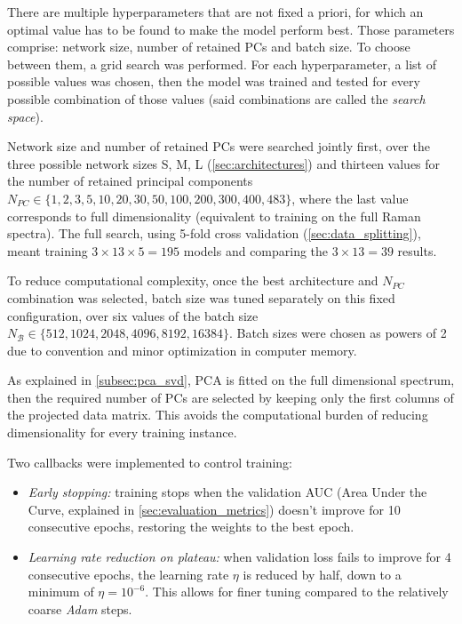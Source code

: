 There are multiple hyperparameters that are not fixed a priori, for which an optimal value has to be found to make the model perform best. Those parameters comprise: network size, number of retained PCs and batch size.
To choose between them, a grid search was performed. For each hyperparameter, a list of possible values was chosen, then the model was trained and tested for every possible combination of those values (said combinations are called the \textit{search space}).

Network size and number of retained PCs were searched jointly first, over the three possible network sizes S, M, L (\cref{sec:architectures}) and thirteen values for the number of retained principal components $N_{PC} \in \{1, 2, 3, 5, 10, 20, 30, 50, 100, 200, 300, 400, 483\}$, where the last value corresponds to full dimensionality (equivalent to training on the full Raman spectra).
The full search, using 5-fold cross validation (\cref{sec:data_splitting}), meant training $3\times 13\times 5 = 195$ models and comparing the $3\times 13 = 39$ results.

To reduce computational complexity, once the best architecture and $N_{PC}$ combination was selected, batch size was tuned separately on this fixed configuration, over six values of the batch size $N_\mathcal{B} \in \{512, 1024, 2048, 4096, 8192, 16384\}$. Batch sizes were chosen as powers of 2 due to convention and minor optimization in computer memory.

As explained in \cref{subsec:pca_svd}, PCA is fitted on the full dimensional spectrum, then the required number of PCs are selected by keeping only the first columns of the projected data matrix. This avoids the computational burden of reducing dimensionality for every training instance.

Two callbacks were implemented to control training:

\begin{itemize}
    \item \textit{Early stopping:} training stops when the validation AUC (Area Under the Curve, explained in \cref{sec:evaluation_metrics}) doesn't improve for 10 consecutive epochs, restoring the weights to the best epoch.
    \item \textit{Learning rate reduction on plateau:} when validation loss fails to improve for 4 consecutive epochs, the learning rate $\eta$ is reduced by half, down to a minimum of $\eta = 10^{-6}$. This allows for finer tuning compared to the relatively coarse \textit{Adam} steps.
\end{itemize}

